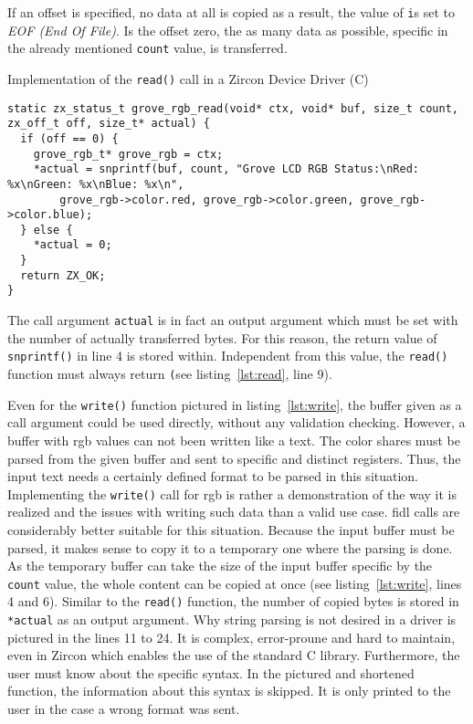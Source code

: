 If an offset is specified, no data at all is copied as a result, the value of \texttt is set to \textit{EOF (End Of File)}.
Is the offset zero, the as many data as possible, specific in the already mentioned \texttt{count} value, is transferred.
%
\begin{listing} [H]
    \caption{Implementation of the \texttt{read()} call in a Zircon Device Driver (C)}
\label{lst:read}
\begin{verbatim}
static zx_status_t grove_rgb_read(void* ctx, void* buf, size_t count, zx_off_t off, size_t* actual) {
  if (off == 0) {
    grove_rgb_t* grove_rgb = ctx;
    *actual = snprintf(buf, count, "Grove LCD RGB Status:\nRed: %x\nGreen: %x\nBlue: %x\n",
        grove_rgb->color.red, grove_rgb->color.green, grove_rgb->color.blue);
  } else {
    *actual = 0;
  }
  return ZX_OK;
}
\end{verbatim}
\end{listing}
%
The call argument \texttt{actual} is in fact an output argument which must be set with the number of actually transferred bytes.
For this reason, the return value of \texttt{snprintf()} in line 4 is stored within.
Independent from this value, the \texttt{read()} function must always return \texttt (see listing~\ref{lst:read}, line 9).

Even for the \texttt{write()} function pictured in listing~\ref{lst:write}, the buffer given as a call argument could be used directly, without any validation checking.
However, a buffer with \ac{rgb} values can not been written like a text.
The color shares must be parsed from the given buffer and sent to specific and distinct registers.
Thus, the input text needs a certainly defined format to be parsed in this situation.
Implementing the \texttt{write()} call for \ac{rgb} is rather a demonstration of the way it is realized and the issues with writing such data than a valid use case.
\ac{fidl} calls are considerably better suitable for this situation.
Because the input buffer must be parsed, it makes sense to copy it to a temporary one where the parsing is done.
As the temporary buffer can take the size of the input buffer specific by the \texttt{count} value, the whole content can be copied at once (see listing~\ref{lst:write}, lines 4 and 6).
Similar to the \texttt{read()} function, the number of copied bytes is stored in \texttt{*actual} as an output argument.
Why string parsing is not desired in a driver is pictured in the lines 11 to 24.
It is complex, error-proune and hard to maintain, even in Zircon which enables the use of the standard C library.
Furthermore, the user must know about the specific syntax.
In the pictured and shortened function, the information about this syntax is skipped.
It is only printed to the user in the case a wrong format was sent.

